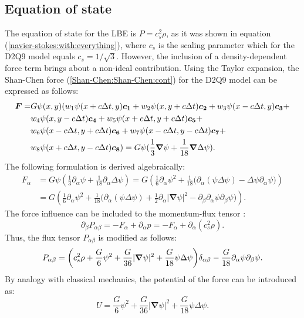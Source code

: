 \documentclass[mathpazo]{cicp}
\begin{document}
\subsection{Equation of state}
The equation of state for the LBE \cite{Succi-book} is $P=c_s^2\rho$, as it was shown in equation (\ref{navier-stokes:with:everything}), where $c_s$ is the scaling parameter which for the D2Q9 model equals $c_s=1/\sqrt{3}$. However, the inclusion of a density-dependent force term brings about a non-ideal contribution.
Using the Taylor expansion, the Shan-Chen force (\ref{Shan-Chen:Shan-Chen:cont}) for the D2Q9 model can be expressed as follows:
\begin{equation}
\begin{aligned}
\bm{F}=&G\psi(x,y)(w_1 \psi(x+c\Delta t,y)\bm{c_{1}}+w_2 \psi(x,y+c\Delta t)\bm{c_{2}}%
+w_3 \psi(x-c\Delta t,y)\bm{c_{3}}+ \\
&w_4 \psi(x,y-c\Delta t)\bm{c_{4}}+w_5 \psi(x+c\Delta t,y+c\Delta t)\bm{c_{5}}+ \\
&w_6 \psi(x-c\Delta t,y+c\Delta t)\bm{c_{6}}+w_7 \psi(x-c\Delta t,y-c\Delta t)\bm{%
c_{7}}+ \\
&w_8 \psi(x+c\Delta t,y-c\Delta t)\bm{c_{8}})=G\psi(\frac{1}{3}\bm{\nabla}\psi+%
\frac{1}{18}\bm{\nabla}\Delta\psi).
\end{aligned}
\end{equation}
The following formulation is derived algebraically:
\begin{equation}
\label{shan-chen:force:taylor:expansion}
\begin{aligned}
F_{\alpha}&=G\psi\left(\frac{1}{3}\partial_{\alpha}\psi+\frac{1}{18}\partial_{\alpha}\Delta%
\psi\right) =G\left(\frac{1}{6}\partial_{\alpha}\psi^2+\frac{1}{18}%
\biggl(\partial_{\alpha}(\psi\Delta\psi)-\Delta\psi\partial_{\alpha}\psi\biggr)\right) \\
&=G\left(\frac{1}{6}\partial_{\alpha}\psi^2+\frac{1}{18}%
\biggl(\partial_{\alpha}(\psi\Delta\psi)+\frac{1}{2}\partial_{\alpha}|\bm{\nabla}\psi|^2
-\partial_{\beta}\partial_{\alpha}\psi\partial_{\beta}\psi\biggr)\right).
\end{aligned}
\end{equation}
The force influence can be included to the momentum-flux tensor \cite{Sbragaglia-Succi}:
\begin{equation*}
\partial_{\beta}P_{\alpha\beta}=-F_{\alpha}+\partial_{\alpha}p=-F_{\alpha}+\partial_{\alpha}(c_s^2%
\rho).
\end{equation*}
Thus, the flux tensor $P_{\alpha\beta}$ is modified as follows:
\begin{equation*}
P_{\alpha\beta}=\biggl(c_s^2\rho+\frac{G}{6}\psi^2+\frac{G}{36}%
|\bm{\nabla}\psi|^2 +\frac{G}{18}\psi\Delta\psi\biggr)\delta_{\alpha\beta}-\frac{G}{%
18}\partial_{\alpha}\psi\partial_{\beta}\psi.
\end{equation*}
By analogy with classical mechanics, the potential of the force can be introduced as:
\begin{equation}
\label{force:potential}
U=\frac{G}{6}\psi^2+\frac{G}{36}|\bm{\nabla}\psi|^2+\frac{G}{18}%
\psi\Delta\psi.
\end{equation}
\end{document}
